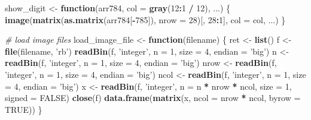 \documentclass[]{book}
\newenvironment{Shaded}{\begin{snugshade}}{\end{snugshade}}
\newcommand{\CommentTok}[1]{\textcolor[rgb]{0.56,0.35,0.01}{\textit{#1}}}
\newcommand{\ControlFlowTok}[1]{\textcolor[rgb]{0.13,0.29,0.53}{\textbf{#1}}}
\newcommand{\DataTypeTok}[1]{\textcolor[rgb]{0.13,0.29,0.53}{#1}}
\newcommand{\DecValTok}[1]{\textcolor[rgb]{0.00,0.00,0.81}{#1}}
\newcommand{\KeywordTok}[1]{\textcolor[rgb]{0.13,0.29,0.53}{\textbf{#1}}}
\newcommand{\NormalTok}[1]{#1}
\newcommand{\OperatorTok}[1]{\textcolor[rgb]{0.81,0.36,0.00}{\textbf{#1}}}
\newcommand{\OtherTok}[1]{\textcolor[rgb]{0.56,0.35,0.01}{#1}}
\newcommand{\StringTok}[1]{\textcolor[rgb]{0.31,0.60,0.02}{#1}}
\theoremstyle{definition}
\theoremstyle{definition}
\theoremstyle{definition}
\theoremstyle{remark}
\begin{document}
\begin{Shaded}
\begin{Highlighting}[]
\NormalTok{show_digit <-}\StringTok{ }\ControlFlowTok{function}\NormalTok{(arr784, }\DataTypeTok{col =} \KeywordTok{gray}\NormalTok{(}\DecValTok{12}\OperatorTok{:}\DecValTok{1} \OperatorTok{/}\StringTok{ }\DecValTok{12}\NormalTok{), ...) \{}
  \KeywordTok{image}\NormalTok{(}\KeywordTok{matrix}\NormalTok{(}\KeywordTok{as.matrix}\NormalTok{(arr784[}\OperatorTok{-}\DecValTok{785}\NormalTok{]), }\DataTypeTok{nrow =} \DecValTok{28}\NormalTok{)[, }\DecValTok{28}\OperatorTok{:}\DecValTok{1}\NormalTok{], }\DataTypeTok{col =}\NormalTok{ col, ...)}
\NormalTok{\}}

\CommentTok{# load image files}
\NormalTok{load_image_file <-}\StringTok{ }\ControlFlowTok{function}\NormalTok{(filename) \{}
\NormalTok{  ret <-}\StringTok{ }\KeywordTok{list}\NormalTok{()}
\NormalTok{  f <-}\StringTok{ }\KeywordTok{file}\NormalTok{(filename, }\StringTok{'rb'}\NormalTok{)}
  \KeywordTok{readBin}\NormalTok{(f, }\StringTok{'integer'}\NormalTok{, }\DataTypeTok{n =} \DecValTok{1}\NormalTok{, }\DataTypeTok{size =} \DecValTok{4}\NormalTok{, }\DataTypeTok{endian =} \StringTok{'big'}\NormalTok{)}
\NormalTok{  n    <-}\StringTok{ }\KeywordTok{readBin}\NormalTok{(f, }\StringTok{'integer'}\NormalTok{, }\DataTypeTok{n =} \DecValTok{1}\NormalTok{, }\DataTypeTok{size =} \DecValTok{4}\NormalTok{, }\DataTypeTok{endian =} \StringTok{'big'}\NormalTok{)}
\NormalTok{  nrow <-}\StringTok{ }\KeywordTok{readBin}\NormalTok{(f, }\StringTok{'integer'}\NormalTok{, }\DataTypeTok{n =} \DecValTok{1}\NormalTok{, }\DataTypeTok{size =} \DecValTok{4}\NormalTok{, }\DataTypeTok{endian =} \StringTok{'big'}\NormalTok{)}
\NormalTok{  ncol <-}\StringTok{ }\KeywordTok{readBin}\NormalTok{(f, }\StringTok{'integer'}\NormalTok{, }\DataTypeTok{n =} \DecValTok{1}\NormalTok{, }\DataTypeTok{size =} \DecValTok{4}\NormalTok{, }\DataTypeTok{endian =} \StringTok{'big'}\NormalTok{)}
\NormalTok{  x <-}\StringTok{ }\KeywordTok{readBin}\NormalTok{(f, }\StringTok{'integer'}\NormalTok{, }\DataTypeTok{n =}\NormalTok{ n }\OperatorTok{*}\StringTok{ }\NormalTok{nrow }\OperatorTok{*}\StringTok{ }\NormalTok{ncol, }\DataTypeTok{size =} \DecValTok{1}\NormalTok{, }\DataTypeTok{signed =} \OtherTok{FALSE}\NormalTok{)}
  \KeywordTok{close}\NormalTok{(f)}
  \KeywordTok{data.frame}\NormalTok{(}\KeywordTok{matrix}\NormalTok{(x, }\DataTypeTok{ncol =}\NormalTok{ nrow }\OperatorTok{*}\StringTok{ }\NormalTok{ncol, }\DataTypeTok{byrow =} \OtherTok{TRUE}\NormalTok{))}
\NormalTok{\}}


\end{Highlighting}
\end{Shaded}
\end{document}
